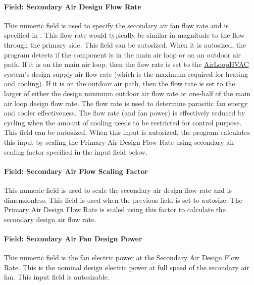 \paragraph{Field: Secondary Air Design Flow Rate}\label{field-secondary-air-design-flow-rate}

This numeric field is used to specify the secondary air fan flow rate and is specified in \si{\volumeFlowRate}. This flow rate would typically be similar in magnitude to the flow through the primary side. This field can be autosized. When it is autosized, the program detects if the component is in the main air loop or on an outdoor air path. If it is on the main air loop, then the flow rate is set to the \hyperref[airloophvac]{AirLoopHVAC} system's design supply air flow rate (which is the maximum required for heating and cooling). If it is on the outdoor air path, then the flow rate is set to the larger of either the design minimum outdoor air flow rate or one-half of the main air loop design flow rate. The flow rate is used to determine parasitic fan energy and cooler effectiveness. The flow rate (and fan power) is effectively reduced by cycling when the amount of cooling needs to be restricted for control purpose. This field can be autosized. When this input is autosized, the program calculates this input by scaling the Primary Air Design Flow Rate using secondary air scaling factor specified in the input field below.

\paragraph{Field: Secondary Air Flow Scaling Factor}\label{field-secondary-air-flow-scaling-factor}

This numeric field is used to scale the secondary air design flow rate and is dimensionless. This field is used when the previous field is set to autosize. The Primary Air Design Flow Rate is scaled using this factor to calculate the secondary design air flow rate.

\paragraph{Field: Secondary Air Fan Design Power}\label{field-secondary-air-fan-design-power}

This numeric field is the fan electric power at the Secondary Air Design Flow Rate. This is the nominal design electric power at full speed of the secondary air fan. This input field is autosizable.

